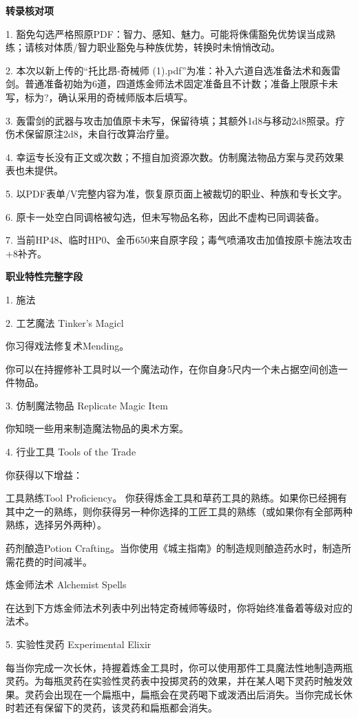 \documentclass[letterpaper,openany,twoside,twocolumn]{book}
\begin{document}
\par\noindent\textbf{转录核对项}\par
1. 豁免勾选严格照原PDF：智力、感知、魅力。可能将侏儒豁免优势误当成熟练；请核对体质/智力职业豁免与种族优势，转换时未悄悄改动。\par
2. 本次以新上传的“托比昂-奇械师 (1).pdf”为准：补入六道自选准备法术和轰雷剑。普通准备初始为6道，四道炼金师法术固定准备且不计数；准备上限原卡未写，标为?，确认采用的奇械师版本后填写。\par
3. 轰雷剑的武器与攻击加值原卡未写，保留待填；其额外1d8与移动2d8照录。疗伤术保留原注2d8，未自行改算治疗量。\par
4. 幸运专长没有正文或次数；不擅自加资源次数。仿制魔法物品方案与灵药效果表也未提供。\par
5. 以PDF表单/V完整内容为准，恢复原页面上被裁切的职业、种族和专长文字。\par
6. 原卡一处空白同调格被勾选，但未写物品名称，因此不虚构已同调装备。\par
7. 当前HP48、临时HP0、金币650来自原字段；毒气喷涌攻击加值按原卡施法攻击+8补齐。\par


\par\noindent\textbf{职业特性完整字段}\par
1. 施法\par
2. 工艺魔法 Tinker's Magicl\par
你习得戏法修复术Mending。\par
你可以在持握修补工具时以一个魔法动作，在你自身5尺内一个未占据空间创造一件物品。\par
3. 仿制魔法物品 Replicate Magic Item\par
你知晓一些用来制造魔法物品的奥术方案。\par
4. 行业工具 Tools of the Trade\par
你获得以下增益：\par
工具熟练Tool Proficiency。 你获得炼金工具和草药工具的熟练。如果你已经拥有其中之一的熟练，则你获得另一种你选择的工匠工具的熟练（或如果你有全部两种熟练，选择另外两种）。\par
药剂酿造Potion Crafting。当你使用《城主指南》的制造规则酿造药水时，制造所需花费的时间减半。\par
炼金师法术 Alchemist Spells\par
在达到下方炼金师法术列表中列出特定奇械师等级时，你将始终准备着等级对应的法术。\par
5. 实验性灵药 Experimental Elixir\par
每当你完成一次长休，持握着炼金工具时，你可以使用那件工具魔法性地制造两瓶灵药。为每瓶灵药在实验性灵药表中投掷灵药的效果，并在某人喝下灵药时触发效果。灵药会出现在一个扁瓶中，扁瓶会在灵药喝下或泼洒出后消失。当你完成长休时若还有保留下的灵药，该灵药和扁瓶都会消失。\par
\par
\end{document}
